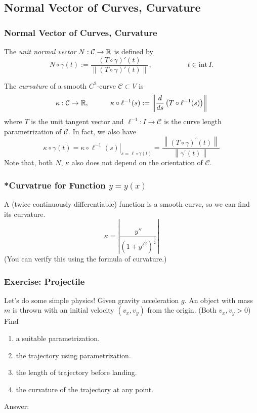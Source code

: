 \documentclass[12pt, t]{beamer}
\renewcommand{\emph}[1]{{\color{Turquoise3}\textsl{#1}}}
\begin{document}
\subsection{Normal Vector of Curves, Curvature}

\begin{frame}
    \frametitle{Normal Vector of Curves, Curvature}
    The \emph{unit normal vector} $N:\mathcal{C}\to\mathbb{R}$ is defined by
    \begin{equation}\label{2.3.8}
        N\circ\gamma(t):=\frac{(T\circ\gamma)'(t)}{\|(T\circ\gamma)'(t)\|},
        \qquad\qquad\quad t\in\text{int}\,I.
    \end{equation}

    The \emph{curvature} of a smooth $C^2$-curve $\mathcal{C}\subset V$ is
    \[\kappa:\mathcal{C}\to\mathbb{R},\qquad\quad
        \kappa\circ\ell^{-1}(s):=\left\|\frac{d}{ds}
        \left(T\circ\ell^{-1}(s)\right)\right\|\]
    where $T$ is the unit tangent vector and $\ell^{-1}:I\to\mathcal{C}$ is the curve length parametrization of $\mathcal{C}$. In fact, we also have\\[5pt]$$\kappa \circ \gamma(t)=\left.\kappa \circ \ell^{-1}(s)\right|_{s=\ell \circ \gamma(t)}=\frac{\left\|(T \circ \gamma)^{\prime}(t)\right\|}{\left\|\gamma^{\prime}(t)\right\|}$$
    Note that, both $N$, $\kappa$ also does not depend on the orientation of $\mathcal{C}$.
\end{frame}

\begin{frame}
    \frametitle{*Curvatrue for Function $y=y(x)$}
    A (twice continuously differentiable) function is a smooth curve, so we can find its curvature.
    $$\kappa=|\dfrac{y''}{(1+y'^2)^{\frac{3}{2}}}|$$
    (You can verify this using the formula of curvature.)
\end{frame}

\begin{frame}[allowframebreaks]
    \frametitle{Exercise: Projectile}
    Let's do some simple physics! Given gravity acceleration $g$. An object with mass $m$ is thrown with an initial velocity $(v_x,v_y)$ from the origin. (Both $v_x,v_y>0$) Find
    \begin{enumerate}
        \item a suitable parametrization.
        \item the trajectory using parametrization.
        \item the length of trajectory before landing.
        \item the curvature of the trajectory at any point.
    \end{enumerate}
    \newpage
    Answer:
\end{frame}
\end{document}
